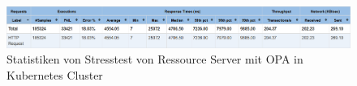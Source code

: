   \begin{figure}[H]
    \centering
    \includegraphics[width=1.0\textwidth]{gfx/statistik-stress-opa-k8s.png}
    \caption{Statistiken von Stresstest von Ressource Server mit OPA in Kubernetes Cluster}
    \label{fig:chapter04:statistik-stress-opa-k8s}
  \end{figure}
